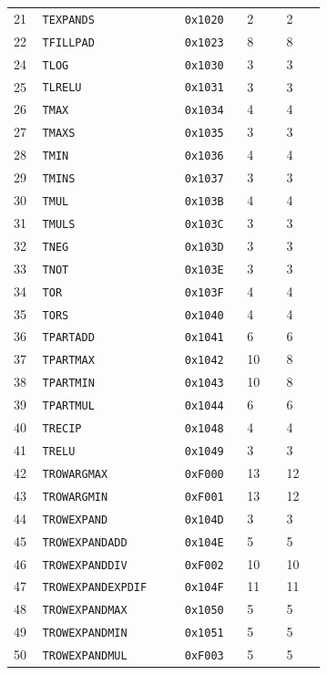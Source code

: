 {\begin{longtable}{@{}R{0.045\linewidth}L{0.31\linewidth}L{0.13\linewidth}R{0.10\linewidth}R{0.10\linewidth}@{}}
21 & \texttt{TEXPANDS} & \texttt{0x1020} & 2 & 2 \\
22 & \texttt{TFILLPAD} & \texttt{0x1023} & 8 & 8 \\
24 & \texttt{TLOG} & \texttt{0x1030} & 3 & 3 \\
25 & \texttt{TLRELU} & \texttt{0x1031} & 3 & 3 \\
26 & \texttt{TMAX} & \texttt{0x1034} & 4 & 4 \\
27 & \texttt{TMAXS} & \texttt{0x1035} & 3 & 3 \\
28 & \texttt{TMIN} & \texttt{0x1036} & 4 & 4 \\
29 & \texttt{TMINS} & \texttt{0x1037} & 3 & 3 \\
30 & \texttt{TMUL} & \texttt{0x103B} & 4 & 4 \\
31 & \texttt{TMULS} & \texttt{0x103C} & 3 & 3 \\
32 & \texttt{TNEG} & \texttt{0x103D} & 3 & 3 \\
33 & \texttt{TNOT} & \texttt{0x103E} & 3 & 3 \\
34 & \texttt{TOR} & \texttt{0x103F} & 4 & 4 \\
35 & \texttt{TORS} & \texttt{0x1040} & 4 & 4 \\
36 & \texttt{TPARTADD} & \texttt{0x1041} & 6 & 6 \\
37 & \texttt{TPARTMAX} & \texttt{0x1042} & 10 & 8 \\
38 & \texttt{TPARTMIN} & \texttt{0x1043} & 10 & 8 \\
39 & \texttt{TPARTMUL} & \texttt{0x1044} & 6 & 6 \\
40 & \texttt{TRECIP} & \texttt{0x1048} & 4 & 4 \\
41 & \texttt{TRELU} & \texttt{0x1049} & 3 & 3 \\
42 & \texttt{TROWARGMAX} & \texttt{0xF000} & 13 & 12 \\
43 & \texttt{TROWARGMIN} & \texttt{0xF001} & 13 & 12 \\
44 & \texttt{TROWEXPAND} & \texttt{0x104D} & 3 & 3 \\
45 & \texttt{TROWEXPANDADD} & \texttt{0x104E} & 5 & 5 \\
46 & \texttt{TROWEXPANDDIV} & \texttt{0xF002} & 10 & 10 \\
47 & \texttt{TROWEXPANDEXPDIF} & \texttt{0x104F} & 11 & 11 \\
48 & \texttt{TROWEXPANDMAX} & \texttt{0x1050} & 5 & 5 \\
49 & \texttt{TROWEXPANDMIN} & \texttt{0x1051} & 5 & 5 \\
50 & \texttt{TROWEXPANDMUL} & \texttt{0xF003} & 5 & 5 \\

\end{longtable}}
